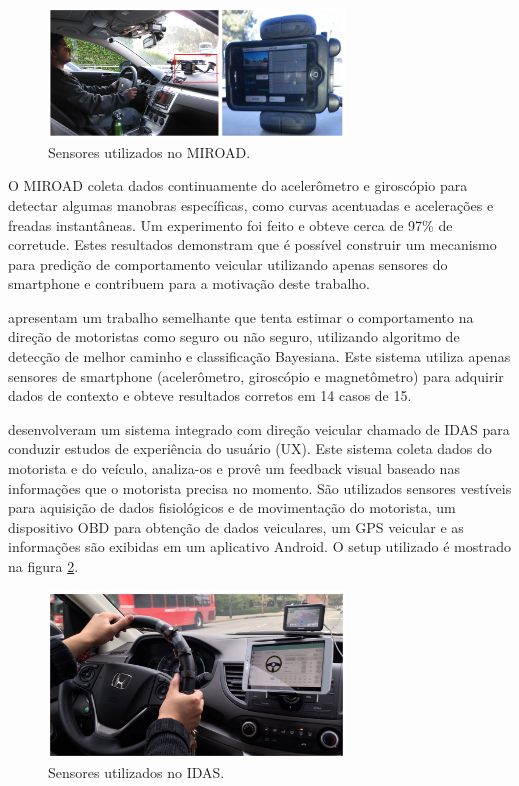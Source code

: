 \begin{figure}[h]
\centering
\includegraphics[width=0.7\textwidth]{images/miroad.png}
\caption{Sensores utilizados no MIROAD. \cite{johnson2011driving}}
\label{miroad}
\end{figure}

O MIROAD coleta dados continuamente do acelerômetro e giroscópio para detectar algumas manobras específicas, como curvas acentuadas
e acelerações e freadas instantâneas.
Um experimento foi feito e obteve cerca de 97\% de corretude. Estes resultados demonstram que é possível construir
um mecanismo para predição de comportamento veicular utilizando apenas sensores do smartphone e contribuem para a motivação deste trabalho.

 apresentam um trabalho semelhante que tenta estimar o comportamento na direção de motoristas como seguro ou
não seguro, utilizando algoritmo de detecção de melhor caminho e classificação Bayesiana. Este sistema utiliza
apenas sensores de smartphone (acelerômetro, giroscópio e magnetômetro) para adquirir dados de contexto e obteve
resultados corretos em 14 casos de 15.

 desenvolveram um sistema integrado com direção veicular chamado de IDAS para conduzir estudos de experiência
do usuário (UX). Este sistema coleta dados do motorista e do veículo, analiza-os e provê um feedback visual baseado
nas informações que o motorista precisa no momento. São utilizados sensores vestíveis para aquisição de dados
fisiológicos e de movimentação do motorista, um dispositivo OBD para obtenção de dados veiculares, um GPS veicular e as informações
são exibidas em um aplicativo Android. O setup utilizado é mostrado na figura \ref{idas}.

\begin{figure}[htb]
\centering
\includegraphics[width=0.7\textwidth]{images/idas.png}
\caption{Sensores utilizados no IDAS. \cite{park2016integrated}}
\label{idas}
\end{figure}

